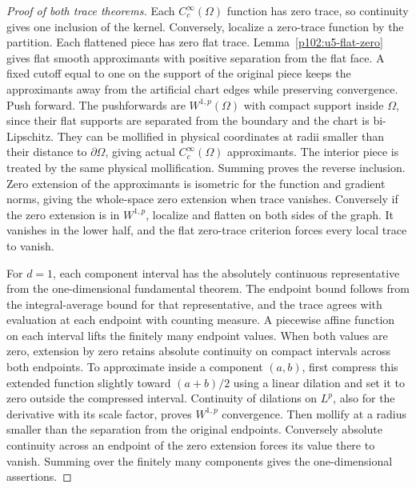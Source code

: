 \documentclass[11pt,oneside,openany]{book}
\theoremstyle{definition}
\theoremstyle{remark}
\begin{document}
\begin{proof}[Proof of both trace theorems]
Each \(C_c^\infty(\Omega)\) function has zero trace, so continuity
gives one inclusion of the kernel. Conversely, localize a
zero-trace function by the partition. Each flattened piece
has zero flat trace. Lemma~\ref{p102:u5-flat-zero} gives
flat smooth approximants with positive separation from the
flat face. A fixed cutoff equal to one on the support of the
original piece keeps the approximants away from the artificial
chart edges while preserving convergence. Push forward. The
pushforwards are \(W^{1,p}(\Omega)\) with compact support inside
\(\Omega\), since their flat supports are separated from the
boundary and the chart is bi-Lipschitz. They can be mollified
in physical coordinates at radii smaller than their distance
to \(\partial\Omega\), giving actual \(C_c^\infty(\Omega)\)
approximants. The interior piece is treated by the same physical
mollification. Summing proves the reverse inclusion. Zero
extension of the approximants is isometric for the function
and gradient norms, giving the whole-space zero extension
when trace vanishes. Conversely if the zero extension is in
\(W^{1,p}\), localize and flatten on both sides of the graph.
It vanishes in the lower half, and the flat zero-trace criterion
forces every local trace to vanish.

For \(d=1\), each component interval has the absolutely continuous
representative from the one-dimensional fundamental theorem. The
endpoint bound follows from the integral-average bound for that
representative, and the trace agrees with evaluation at each
endpoint with counting measure. A piecewise affine function on
each interval lifts the finitely many endpoint values. When both
values are zero, extension by zero retains absolute continuity
on compact intervals across both endpoints. To approximate inside
a component \((a,b)\), first compress this extended function
slightly toward \((a+b)/2\) using a linear dilation and set it
to zero outside the compressed interval. Continuity of dilations
on \(L^p\), also for the derivative with its scale factor, proves
\(W^{1,p}\) convergence. Then mollify at a radius smaller than
the separation from the original endpoints. Conversely absolute
continuity across an endpoint of the zero extension forces its
value there to vanish. Summing over the finitely many components
gives the one-dimensional assertions.
\end{proof}
\end{document}
